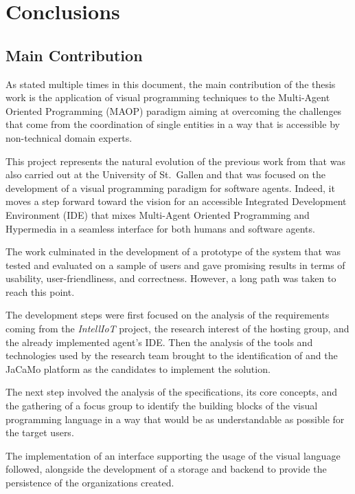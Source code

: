 \chapter*{Conclusions}

\section*{Main Contribution}
As stated multiple times in this document, the main contribution of the thesis work is the application of visual programming techniques to the Multi-Agent Oriented Programming (MAOP) paradigm aiming at overcoming the challenges that come from the coordination of single entities in a way that is accessible by non-technical domain experts.

This project represents the natural evolution of the previous work from \cite{burattini2022agent} that was also carried out at the University of St.\ Gallen and that was focused on the development of a visual programming paradigm for software agents.
Indeed, it moves a step forward toward the vision for an accessible Integrated Development Environment (IDE) that mixes Multi-Agent Oriented Programming and Hypermedia in a seamless interface for both humans and software agents.

The work culminated in the development of a prototype of the system that was tested and evaluated on a sample of users and gave promising results in terms of usability, user-friendliness, and correctness.
However, a long path was taken to reach this point.

The development steps were first focused on the analysis of the requirements coming from the \textit{IntellIoT} project, the research interest of the hosting group, and the already implemented agent's IDE.
Then the analysis of the tools and technologies used by the research team brought to the identification of \moise{} and the JaCaMo platform as the candidates to implement the solution.

The next step involved the analysis of the \moise{} specifications, its core concepts, and the gathering of a focus group to identify the building blocks of the visual programming language in a way that would be as understandable as possible for the target users.

The implementation of an interface supporting the usage of the visual language followed, alongside the development of a storage and backend to provide the persistence of the organizations created.

